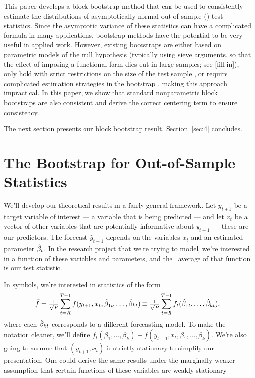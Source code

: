 \documentclass[12pt,fleqn]{article}
\begin{document}
This paper develops a block bootstrap method that can be used to
consistently estimate the distributions of asymptotically normal
out-of-sample (\oos) test statistics. Since the asymptotic variance of
these statistics can have a complicated formula in many applications,
bootstrap methods have the potential to be very useful in applied
work. However, existing bootstraps are either based on parametric
models of the null hypothesis (typically using sieve arguments, so
that the effect of imposing a functional form dies out in large
samples; see [fill in]), only hold with strict restrictions on the
size of the test sample \citep{Whi:00,Han:05}, or require complicated
estimation strategies in the bootstrap \citep{CoS:07}, making this
approach impractical. In this paper, we show that standard
nonparametric block bootstraps are also consistent and derive the
correct centering term to ensure consistency.

The next section presents our block bootstrap result.
Section~\ref{sec:4} concludes.

\section{The Bootstrap for Out-of-Sample Statistics}

We'll develop our theoretical results in a fairly general
framework. Let $y_{t+1}$ be a target variable of interest --- a
variable that is being predicted --- and let $x_t$ be a vector of
other variables that are potentially informative about $y_{t+1}$ ---
these are our predictors. The forecast $\hat y_{t+1}$ depends on the
variables $x_t$ and an estimated parameter $\hat \beta_t$. In the research
project that we're trying to model, we're interested in a function of
these variables and parameters, and the \oos\ average of that function
is our test statistic.

In symbols, we're interested in statistics of the form
\begin{equation*}
  \bar f = \tfrac{1}{\sqrt{P}} \sum_{t=R}^{T-1} f(y_{t+1}, x_t, \hat \beta_{1t},\dots,\hat \beta_{kt})
  \equiv \tfrac{1}{\sqrt{P}} \sum_{t=R}^{T-1} f_t(\hat \beta_{1t},\dots,\hat \beta_{kt}),
\end{equation*}
where each $\hat \beta_{kt}$ corresponds to a different forecasting model.
To make the notation cleaner, we'll define $f_t(\beta_1,\dots,\beta_k)
\equiv f(y_{t+1}, x_t, \beta_1,\dots,\beta_k)$. We're also going to
assume that $(y_{t+1}, x_t)$ is strictly stationary to simplify our
presentation. One could derive the same results under the marginally
weaker assumption that certain functions of these variables are weakly
stationary.
\end{document}
